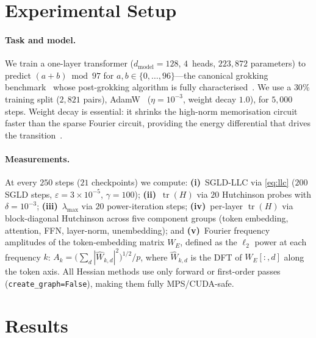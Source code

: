 \documentclass[12pt]{article}
\begin{document}
\section{Experimental Setup}
\label{sec:setup}

\paragraph{Task and model.}
We train a one-layer transformer ($d_\mathrm{model}=128$, $4$~heads, $223{,}872$
parameters) to predict $(a+b) \bmod 97$ for $a,b \in \{0,\ldots,96\}$—the
canonical grokking benchmark~\citep{power2022grokking} whose post-grokking
algorithm is fully characterised~\citep{nanda2023progress}.  We use a $30\%$
training split ($2{,}821$ pairs), AdamW~\citep{kingma2015adam,loshchilov2019decoupled}
($\eta=10^{-3}$, weight decay $1.0$), for $5{,}000$ steps.  Weight decay is
essential: it shrinks the high-norm memorisation circuit faster than the
sparse Fourier circuit, providing the energy differential that drives the
transition~\citep{varma2023explaining}.

\paragraph{Measurements.}
At every $250$ steps ($21$ checkpoints) we compute:
\textbf{(i)}~SGLD-LLC via \cref{eq:llc} ($200$ SGLD steps,
$\varepsilon=3\!\times\!10^{-5}$, $\gamma=100$);
\textbf{(ii)}~$\operatorname{tr}(H)$ via $20$ Hutchinson probes with
$\delta=10^{-3}$;
\textbf{(iii)}~$\lambda_{\max}$ via $20$ power-iteration steps;
\textbf{(iv)}~per-layer $\operatorname{tr}(H)$ via block-diagonal Hutchinson
across five component groups (token embedding, attention, FFN, layer-norm,
unembedding); and
\textbf{(v)}~Fourier frequency amplitudes of the token-embedding matrix $W_E$,
defined as the $\ell_2$ power at each frequency $k$:
$A_k = \bigl(\sum_d |\hat{W}_{k,d}|^2\bigr)^{1/2}/p$,
where $\hat{W}_{k,d}$ is the DFT of $W_E[:,d]$ along the token axis.
All Hessian methods use only forward or first-order passes
(\texttt{create\_graph=False}), making them fully MPS/CUDA-safe.

\section{Results}
\label{sec:results}
\end{document}
